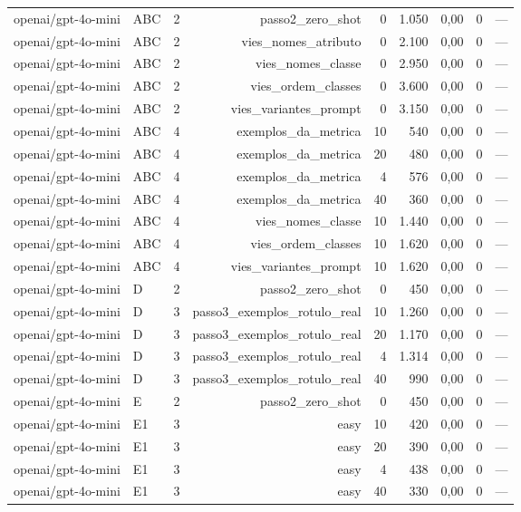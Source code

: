 \begin{table}[htbp]
\begin{tabular}{lllrrrrrr}
openai/gpt-4o-mini & ABC & 2 & passo2\_zero\_shot & 0 & 1.050 & 0,00 & 0 & — \\
openai/gpt-4o-mini & ABC & 2 & vies\_nomes\_atributo & 0 & 2.100 & 0,00 & 0 & — \\
openai/gpt-4o-mini & ABC & 2 & vies\_nomes\_classe & 0 & 2.950 & 0,00 & 0 & — \\
openai/gpt-4o-mini & ABC & 2 & vies\_ordem\_classes & 0 & 3.600 & 0,00 & 0 & — \\
openai/gpt-4o-mini & ABC & 2 & vies\_variantes\_prompt & 0 & 3.150 & 0,00 & 0 & — \\
openai/gpt-4o-mini & ABC & 4 & exemplos\_da\_metrica & 10 & 540 & 0,00 & 0 & — \\
openai/gpt-4o-mini & ABC & 4 & exemplos\_da\_metrica & 20 & 480 & 0,00 & 0 & — \\
openai/gpt-4o-mini & ABC & 4 & exemplos\_da\_metrica & 4 & 576 & 0,00 & 0 & — \\
openai/gpt-4o-mini & ABC & 4 & exemplos\_da\_metrica & 40 & 360 & 0,00 & 0 & — \\
openai/gpt-4o-mini & ABC & 4 & vies\_nomes\_classe & 10 & 1.440 & 0,00 & 0 & — \\
openai/gpt-4o-mini & ABC & 4 & vies\_ordem\_classes & 10 & 1.620 & 0,00 & 0 & — \\
openai/gpt-4o-mini & ABC & 4 & vies\_variantes\_prompt & 10 & 1.620 & 0,00 & 0 & — \\
openai/gpt-4o-mini & D & 2 & passo2\_zero\_shot & 0 & 450 & 0,00 & 0 & — \\
openai/gpt-4o-mini & D & 3 & passo3\_exemplos\_rotulo\_real & 10 & 1.260 & 0,00 & 0 & — \\
openai/gpt-4o-mini & D & 3 & passo3\_exemplos\_rotulo\_real & 20 & 1.170 & 0,00 & 0 & — \\
openai/gpt-4o-mini & D & 3 & passo3\_exemplos\_rotulo\_real & 4 & 1.314 & 0,00 & 0 & — \\
openai/gpt-4o-mini & D & 3 & passo3\_exemplos\_rotulo\_real & 40 & 990 & 0,00 & 0 & — \\
openai/gpt-4o-mini & E & 2 & passo2\_zero\_shot & 0 & 450 & 0,00 & 0 & — \\
openai/gpt-4o-mini & E1 & 3 & easy & 10 & 420 & 0,00 & 0 & — \\
openai/gpt-4o-mini & E1 & 3 & easy & 20 & 390 & 0,00 & 0 & — \\
openai/gpt-4o-mini & E1 & 3 & easy & 4 & 438 & 0,00 & 0 & — \\
openai/gpt-4o-mini & E1 & 3 & easy & 40 & 330 & 0,00 & 0 & — \\

\end{tabular}
\end{table}
